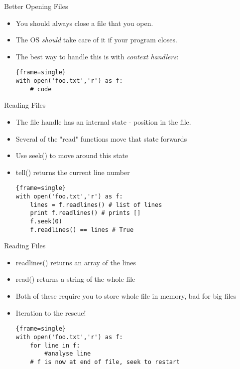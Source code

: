 \documentclass{beamer}
\begin{document}
\begin{frame}[fragile]{Better Opening Files}
\begin{itemize}
\item You should always close a file that you open.
\item The OS \emph{should} take care of it if your program closes.
\pause
\item The best way to handle this is with \emph{context handlers}:
  \begin{block}{}
\begin{lstlisting}{frame=single}
with open('foo.txt','r') as f:
    # code
\end{lstlisting}
\end{block}
\end{itemize}
\end{frame}

\begin{frame}[fragile]{Reading Files}
	\begin{itemize}
	\item {The file handle has an internal state - position in the file.
	}
	\pause
	\item {Several of the "read" functions move that state forwards}
	\pause
	\item {Use seek() to move around this state}
	\pause
	\item tell() returns the current line number
\begin{block}{}
\begin{lstlisting}{frame=single}
with open('foo.txt','r') as f:
    lines = f.readlines() # list of lines     
    print f.readlines() # prints []
    f.seek(0)
    f.readlines() == lines # True
\end{lstlisting}
\end{block}
\end{itemize}
\end{frame}


\begin{frame}[fragile]{Reading Files}
	\begin{itemize}
	\item {readlines() returns an array of the lines
	}
	\item {read() returns a string of the whole file }
	\pause
	\item {Both of these require you to store whole file in memory, bad for big files}
	\pause
	\item Iteration to the rescue!
\begin{block}{}
\begin{lstlisting}{frame=single}
with open('foo.txt','r') as f:
    for line in f:
        #analyse line 
    # f is now at end of file, seek to restart
\end{lstlisting}
\end{block}
\end{itemize}
\end{frame}
\end{document}

